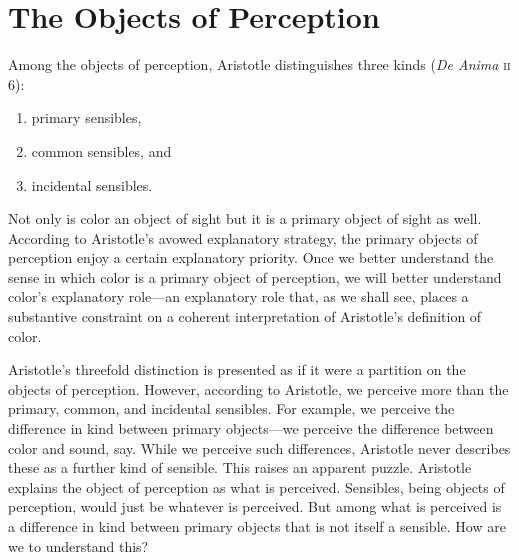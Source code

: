 
\section{The Objects of Perception} %
\label{sec:the_objects_of_perception}

Among the objects of perception, Aristotle distinguishes three kinds (\emph{De Anima} \textsc{ii} 6):
\begin{enumerate}[(1)]
	\item primary sensibles,
	\item common sensibles, and
	\item incidental sensibles.
\end{enumerate}
Not only is color an object of sight but it is a primary object of sight as well. According to Aristotle's avowed explanatory strategy, the primary objects of perception enjoy a certain explanatory priority. Once we better understand the sense in which color is a primary object of perception, we will better understand color's explanatory role---an explanatory role that, as we shall see, places a substantive constraint on a coherent interpretation of Aristotle's definition of color.

Aristotle's threefold distinction is presented as if it were a partition on the objects of perception. However, according to Aristotle, we perceive more than the primary, common, and incidental sensibles. For example, we perceive the difference in kind between primary objects---we perceive the difference between color and sound, say. While we perceive such differences, Aristotle never describes these as a further kind of sensible. This raises an apparent puzzle. Aristotle explains the object of perception as what is perceived. Sensibles, being objects of perception, would just be whatever is perceived. But among what is perceived is a difference in kind between primary objects that is not itself a sensible. How are we to understand this? 

